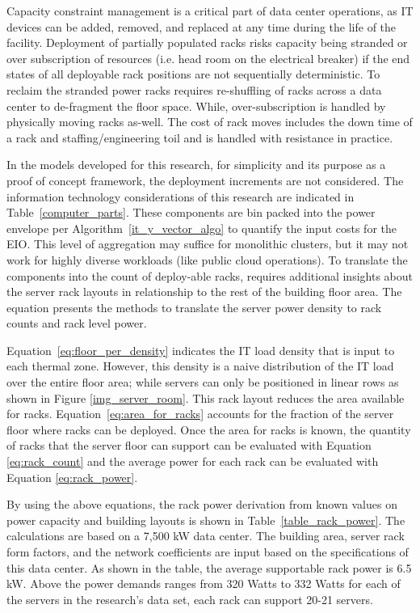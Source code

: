     Capacity constraint management is a critical part of data center operations, as IT devices can be added, removed, and replaced at any time during the life of the facility. Deployment of partially populated racks risks capacity being stranded or over subscription of resources (i.e. head room on the electrical breaker) if the end states of all deployable rack positions are not sequentially deterministic. To reclaim the stranded power racks requires re-shuffling of racks across a data center to de-fragment the floor space. While, over-subscription is handled by physically moving racks as-well. The cost of rack moves includes the down time of a rack and staffing/engineering toil and is handled with resistance in practice.
    
    In the models developed for this research, for simplicity and its purpose as a proof of concept framework, the deployment increments are not considered. The information technology considerations of this research are indicated in Table~\ref{computer_parts}. These components are bin packed into the power envelope per Algorithm~\ref{it_y_vector_algo} to quantify the input costs for the EIO. This level of aggregation may suffice for monolithic clusters, but it may not work for highly diverse workloads (like public cloud operations). To translate the components into the count of deploy-able racks, requires additional insights about the server rack layouts in relationship to the rest of the building floor area. The equation presents the methods to translate the server power density to rack counts and rack level power.
    
    
    
    Equation~\ref{eq:floor_per_density} indicates the  IT load density that is input to each thermal zone. However, this density is a naive distribution of the IT load over the entire floor area; while servers can only be positioned in linear rows as shown in Figure \ref{img_server_room}. This rack layout reduces the area available for racks. Equation~\ref{eq:area_for_racks} accounts for the fraction of the server floor where racks can be deployed. Once the area for racks is known, the quantity of racks that the server floor can support can be evaluated with Equation \ref{eq:rack_count} and the average power for each rack can be evaluated with Equation \ref{eq:rack_power}.
    
    By using the above equations, the rack power derivation from known values on power capacity and building layouts is shown in Table~\ref{table_rack_power}. The calculations are based on a 7,500 kW data center. The building area, server rack form factors, and the network coefficients are input based on the specifications of this data center. As shown in the table, the average supportable rack power is 6.5 kW. Above the power demands ranges from 320 Watts to 332 Watts for each of the servers in the research's data set, each rack can support 20-21 servers.
    
